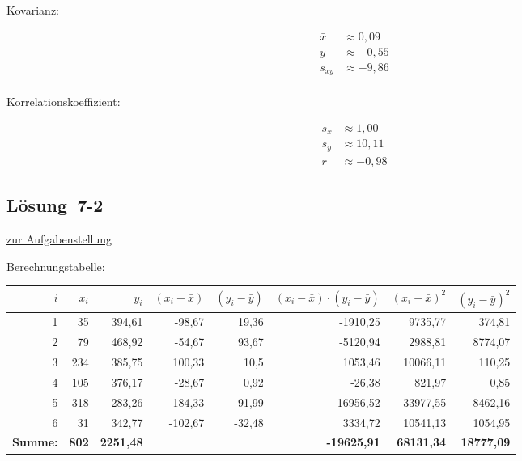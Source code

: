 \documentclass[
  11pt,
  ngerman,
  a4paper,
]{report}
\begin{document}
\begin{enumerate}
  Kovarianz:

  \[\begin{aligned}
   \bar{x} &\approx 0{,}09\\
   \bar{y} &\approx -0{,}55\\
   s_{xy}&\approx -9{,}86\\
   \end{aligned}\]

  Korrelationskoeffizient:

  \[\begin{aligned}
   s_x &\approx 1{,}00\\
   s_y &\approx 10{,}11\\
   r &\approx -0{,}98
   \end{aligned}\]
\end{enumerate}

\hypertarget{loesung-7-2}{%
\subsection{Lösung~7-2}\label{loesung-7-2}}

\protect\hyperlink{aufgabe-7-2}{zur Aufgabenstellung}

Berechnungstabelle:

\begin{table}[H]
\centering
\begin{tabular}{rrrrrrrr}
\toprule
\textbf{$i$} & \textbf{$x_i$} & \textbf{$y_i$} & \textbf{$(x_i-\bar{x})$} & \textbf{$(y_i-\bar{y})$} & \textbf{$(x_i-\bar{x})\cdot(y_i-\bar{y})$} & \textbf{$(x_i-\bar{x})^2$} & \textbf{$(y_i-\bar{y})^2$}\\
\midrule
1 & 35 & 394,61 & -98,67 & 19,36 & -1910,25 & 9735,77 & 374,81\\
2 & 79 & 468,92 & -54,67 & 93,67 & -5120,94 & 2988,81 & 8774,07\\
3 & 234 & 385,75 & 100,33 & 10,5 & 1053,46 & 10066,11 & 110,25\\
4 & 105 & 376,17 & -28,67 & 0,92 & -26,38 & 821,97 & 0,85\\
5 & 318 & 283,26 & 184,33 & -91,99 & -16956,52 & 33977,55 & 8462,16\\
6 & 31 & 342,77 & -102,67 & -32,48 & 3334,72 & 10541,13 & 1054,95\\
\midrule
\textbf{Summe:} & \textbf{802} & \textbf{2251,48} & \textbf{} & \textbf{} & \textbf{-19625,91} & \textbf{68131,34} & \textbf{18777,09}\\
\bottomrule
\end{tabular}
\end{table}
\end{document}
